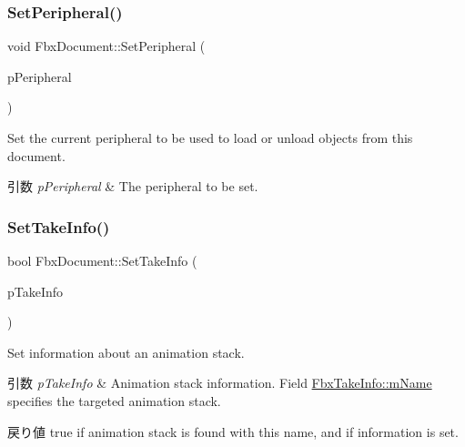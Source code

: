\subsubsection{\texorpdfstring{Set\+Peripheral()}{SetPeripheral()}}
{\footnotesize\ttfamily void Fbx\+Document\+::\+Set\+Peripheral (\begin{DoxyParamCaption}\item[{\hyperlink{class_fbx_peripheral}{Fbx\+Peripheral} $\ast$}]{p\+Peripheral }\end{DoxyParamCaption})}

Set the current peripheral to be used to load or unload objects from this document. 
\begin{DoxyParams}{引数}
{\em p\+Peripheral} & The peripheral to be set. \\
\hline
\end{DoxyParams}
\mbox{\label{class_fbx_document_ace5043bd6c9883d00cfb6a2eb6d74d5c}} 
\subsubsection{\texorpdfstring{Set\+Take\+Info()}{SetTakeInfo()}}
{\footnotesize\ttfamily bool Fbx\+Document\+::\+Set\+Take\+Info (\begin{DoxyParamCaption}\item[{const \hyperlink{class_fbx_take_info}{Fbx\+Take\+Info} \&}]{p\+Take\+Info }\end{DoxyParamCaption})}

Set information about an animation stack. 
\begin{DoxyParams}{引数}
{\em p\+Take\+Info} & Animation stack information. Field \hyperlink{class_fbx_take_info_ac505b495f047d57eda55340f699f583e}{Fbx\+Take\+Info\+::m\+Name} specifies the targeted animation stack. \\
\hline
\end{DoxyParams}
\begin{DoxyReturn}{戻り値}
{\ttfamily true} if animation stack is found with this name, and if information is set. 
\end{DoxyReturn}
\mbox{\label{class_fbx_document_a76c37d7528bf2be38b1de4ef7b60dfbb}} 
